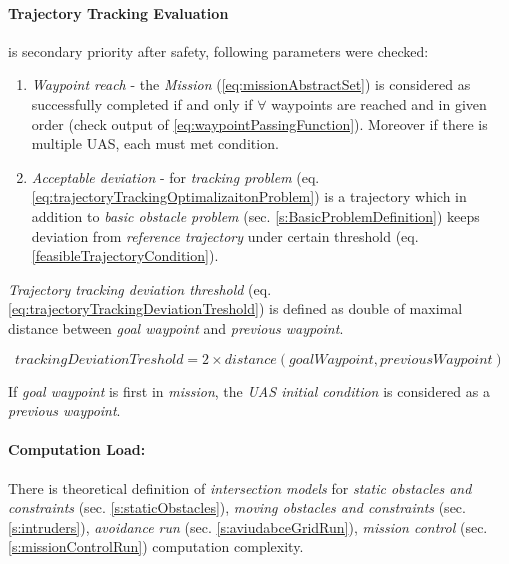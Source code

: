 \paragraph{Trajectory Tracking Evaluation} is secondary priority after safety, following parameters were checked:

\begin{enumerate}
    \item \emph{Waypoint reach} - the \emph{Mission} (\ref{eq:missionAbstractSet}) is considered as successfully completed if and only if $\forall$ waypoints are reached and in given order (check output of \ref{eq:waypointPassingFunction}). Moreover if there is multiple UAS, each must met condition.
    
    \item \emph{Acceptable deviation} - for \emph{tracking problem} (eq. \ref{eq:trajectoryTrackingOptimalizaitonProblem}) is a trajectory which in addition to \emph{basic obstacle problem} (sec. \ref{s:BasicProblemDefinition}) keeps deviation from \emph{reference trajectory} under certain threshold (eq. \ref{feasibleTrajectoryCondition}). 
\end{enumerate}

\noindent\emph{Trajectory tracking deviation threshold} (eq. \ref{eq:trajectoryTrackingDeviationTreshold}) is defined as double of maximal distance between \emph{goal waypoint} and \emph{previous waypoint}. 

\begin{equation}\label{eq:trajectoryTrackingDeviationTreshold}
        trackingDeviationTreshold =  2 \times distance (goalWaypoint,previousWaypoint)
\end{equation}

\begin{note}
    If \emph{goal waypoint} is first in \emph{mission}, the \emph{UAS initial condition} is considered as a \emph{previous waypoint}.
\end{note}

\paragraph{Computation Load:} There is theoretical definition of \emph{intersection models} for \emph{static obstacles and constraints} (sec. \ref{s:staticObstacles}), \emph{moving obstacles and constraints} (sec. \ref{s:intruders}), \emph{avoidance run} (sec. \ref{s:aviudabceGridRun}), \emph{mission control} (sec. \ref{s:missionControlRun}) computation complexity.

